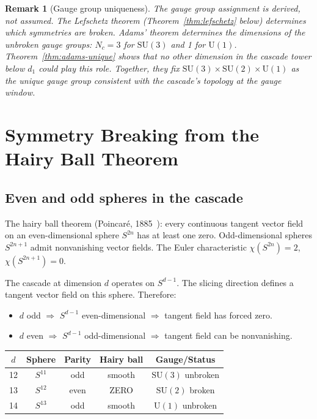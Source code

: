 \documentclass[12pt,a4paper]{article}
\newtheorem{remark}[theorem]{Remark}
\begin{document}
\begin{remark}[Gauge group uniqueness]
The gauge group assignment is derived, not assumed. The Lefschetz theorem
(Theorem~\ref{thm:lefschetz} below) determines which symmetries are broken.
Adams' theorem determines the dimensions of the unbroken gauge groups: $N_c=3$ for
$\mathrm{SU}(3)$ and 1 for $\mathrm{U}(1)$. Theorem~\ref{thm:adams-unique} shows that
no other dimension in the cascade tower below $d_1$ could play this role.
Together, they fix $\mathrm{SU}(3)\times\mathrm{SU}(2)\times\mathrm{U}(1)$ as the unique
gauge group consistent with the cascade's topology at the gauge window.
\end{remark}

\section{Symmetry Breaking from the Hairy Ball Theorem}
\label{sec:breaking}

\subsection{Even and odd spheres in the cascade}

The hairy ball theorem (Poincar\'{e}, 1885~\cite{poincare}): every continuous tangent vector
field on an even-dimensional sphere $S^{2n}$ has at least one zero. Odd-dimensional spheres
$S^{2n+1}$ admit nonvanishing vector fields. The Euler characteristic
$\chi(S^{2n})=2$, $\chi(S^{2n+1})=0$.

The cascade at dimension $d$ operates on $S^{d-1}$. The slicing direction defines a tangent
vector field on this sphere. Therefore:
\begin{itemize}
\item $d$ odd $\Rightarrow$ $S^{d-1}$ even-dimensional $\Rightarrow$ tangent field has
forced zero.
\item $d$ even $\Rightarrow$ $S^{d-1}$ odd-dimensional $\Rightarrow$ tangent field can be
nonvanishing.
\end{itemize}

\begin{center}
\begin{tabular}{ccccc}
\toprule
$d$ & Sphere & Parity & Hairy ball & Gauge/Status \\
\midrule
12 & $S^{11}$ & odd  & smooth & $\mathrm{SU}(3)$ unbroken \\
13 & $S^{12}$ & even & ZERO   & $\mathrm{SU}(2)$ broken \\
14 & $S^{13}$ & odd  & smooth & $\mathrm{U}(1)$ unbroken \\
\bottomrule
\end{tabular}
\end{center}
\end{document}
